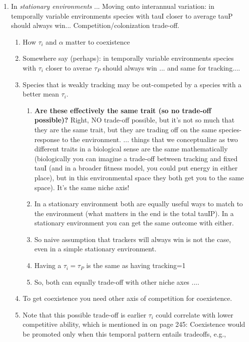 \documentclass[11pt,letterpaper]{article}
\begin{document}
\begin{enumerate}
\begin{enumerate}
\begin{enumerate}
\end{enumerate}
\item In \emph{stationary environments} ...
Moving onto interannual variation: in temporally variable environments species with tauI closer to average tauP should always win... 
Competition/colonization trade-off.
\begin{enumerate}
\item How $\tau_i$ and $\alpha$ matter to coexistence
\item Somewhere say (perhaps): in temporally variable environments species with $\tau_i$ closer to averae $\tau_{P}$ should always win ... and same for tracking....
\item Species that is weakly tracking may be out-competed by a species with a better mean $\tau_i$. 
\begin{enumerate}
\item {\bf Are these effectively the same trait (so no trade-off possible)?} Right, NO trade-off possible, but it's not so much that they are the same trait, but they are trading off on the same species-response to the environment. ... things that we conceptualize as two different traits in a biological sense are the same mathematically (biologically you can imagine a trade-off between tracking and fixed tauI (and in a broader fitness model, you could put energy in either place), but in this environmental space they both get you to the same space). It's the same niche axis!
\item  In a stationary environment both are equally useful ways to match to the environment (what matters in the end is the total tauIP). In a stationary environment you can get the same outcome with either. 
\item So naive assumption that trackers will always win is not the case, even in a simple stationary environment.
\item Having a $\tau_i = \tau_P$ is the same as having tracking=1
\item So, both can equally trade-off with other niche axes .... 
\end{enumerate}
\item To get coexistence you need other axis of competition for coexistence. \item Note that this possible trade-off is earlier \(\tau_{i}\) could correlate with lower competitive ability, which is mentioned in \citet{Chesson:2004eo} on page 245: Coexistence would be promoted only when this temporal pattern entails tradeoffs, e.g.,

\end{enumerate}
\end{enumerate}
\end{enumerate}
\end{document}
